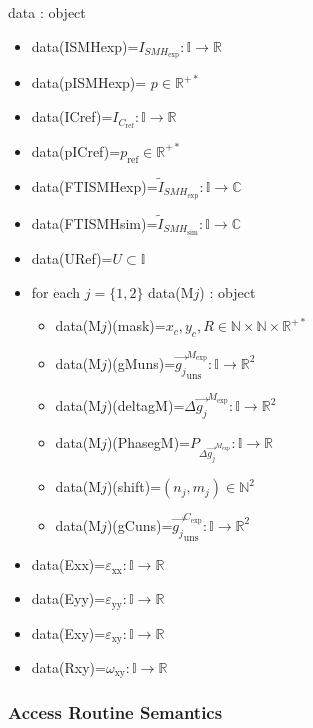 \documentclass[12pt, titlepage]{article}
\begin{document}
data : object
\begin{itemize}
\item 
data(ISMHexp)=$I_{\mathit{SMH}_{\text{exp}}}:\mathbb{I}\rightarrow\mathbb{R}$
\item data(pISMHexp)= $p \in \mathbb{R}^{+*}$
\item data(ICref)=$I_{\mathit{C}_{\text{ref}}}:\mathbb{I}\rightarrow\mathbb{R}$
\item data(pICref)=$p_{\text{ref}} \in \mathbb{R}^{+*}$
\item 
data(FTISMHexp)=$\widetilde{I}_{\mathit{SMH}_{\text{exp}}}:\mathbb{I}\rightarrow\mathbb{C}$
\item 
data(FTISMHsim)=$\widetilde{I}_{\mathit{SMH}_{\text{sim}}}:\mathbb{I}\rightarrow\mathbb{C}$
\item data(URef)=$U \subset \mathbb{I}$
\item for each $j=\{1,2\}$ data(M$j$) : object 
	\begin{itemize}
	\item data(M$j$)(mask)=$x_c,y_c,R \in 
\mathbb{N}\times\mathbb{N}\times\mathbb{R}^{+*}$
	\item 
data(M$j$)(gMuns)=$\overrightarrow{g_{j}}_{\text{uns}}^{M_{\text{exp}}}:\mathbb{I}\rightarrow\mathbb{R}^2$
	\item data(M$j$)(deltagM)=$\Delta 
\overrightarrow{g_{j}}^{M_{\text{exp}}}:\mathbb{I}\rightarrow\mathbb{R}^2$
	\item data(M$j$)(PhasegM)=$P_{\Delta 
\overrightarrow{g_{j}}^{M_{\text{exp}}}}:\mathbb{I}\rightarrow\mathbb{R}$
	\item data(M$j$)(shift)=$(n_j,m_j)\in\mathbb{N}^2$
	\item 
data(M$j$)(gCuns)=$\overrightarrow{g_{j}}_{\text{uns}}^{C_{\text{exp}}}:\mathbb{I}\rightarrow\mathbb{R}^2$
	\end{itemize}
\item data(Exx)=$\varepsilon_{\text{xx}}:\mathbb{I}\rightarrow\mathbb{R}$
\item data(Eyy)=$\varepsilon_{\text{yy}}:\mathbb{I}\rightarrow\mathbb{R}$
\item data(Exy)=$\varepsilon_{\text{xy}}:\mathbb{I}\rightarrow\mathbb{R}$
\item data(Rxy)=$\omega_{\text{xy}}:\mathbb{I}\rightarrow\mathbb{R}$
\end{itemize}

\subsubsection{Access Routine Semantics}
\end{document}

